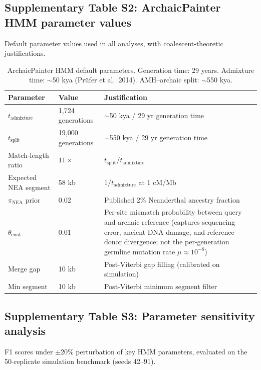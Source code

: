 \subsection*{Supplementary Table S2: ArchaicPainter HMM parameter values}

Default parameter values used in all analyses, with coalescent-theoretic justifications.

\begin{table}[h]
\centering
\begin{tabular}{lll}
\hline
\textbf{Parameter} & \textbf{Value} & \textbf{Justification} \\
\hline
$t_\mathrm{admixture}$ & 1,724 generations & $\sim$50 kya / 29 yr generation time \\
$t_\mathrm{split}$ & 19,000 generations & $\sim$550 kya / 29 yr generation time \\
Match-length ratio & $11\times$ & $t_\mathrm{split} / t_\mathrm{admixture}$ \\
Expected NEA segment & 58 kb & $1 / t_\mathrm{admixture}$ at 1 cM/Mb \\
$\pi_\mathrm{NEA}$ prior & 0.02 & Published 2\% Neanderthal ancestry fraction \\
$\theta_\mathrm{emit}$ & 0.01 & Per-site mismatch probability between query and archaic reference (captures sequencing error, ancient DNA damage, and reference--donor divergence; not the per-generation germline mutation rate $\mu \approx 10^{-8}$) \\
Merge gap & 10 kb & Post-Viterbi gap filling (calibrated on simulation) \\
Min segment & 10 kb & Post-Viterbi minimum segment filter \\
\hline
\end{tabular}
\caption{ArchaicPainter HMM default parameters. Generation time: 29 years.
Admixture time: $\sim$50 kya (Prüfer et al.\ 2014). AMH--archaic split: $\sim$550 kya.}
\label{tab:params}
\end{table}

\subsection*{Supplementary Table S3: Parameter sensitivity analysis}

F1 scores under $\pm$20\% perturbation of key HMM parameters, evaluated on the
50-replicate simulation benchmark (seeds 42--91).

